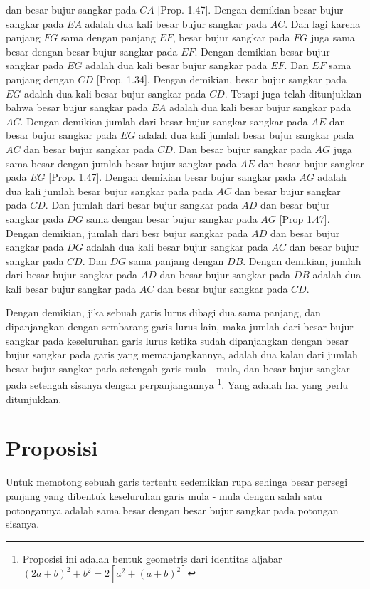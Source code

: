 \documentclass[a4paper]{book}
\begin{document}
dan besar bujur sangkar pada $CA$ [Prop. 1.47]. Dengan demikian besar bujur
sangkar pada $EA$ adalah dua kali besar bujur sangkar pada $AC$. Dan lagi 
karena panjang $FG$ sama dengan panjang $EF$, besar bujur sangkar pada $FG$
juga sama besar dengan besar bujur sangkar pada $EF$. Dengan demikian besar
bujur sangkar pada $EG$ adalah dua kali besar bujur sangkar pada $EF$. Dan 
$EF$ sama panjang dengan $CD$ [Prop. 1.34]. Dengan demikian, besar bujur 
sangkar pada $EG$ adalah dua kali besar bujur sangkar pada $CD$. Tetapi juga
telah ditunjukkan bahwa besar bujur sangkar pada $EA$ adalah dua kali besar
bujur sangkar pada $AC$. Dengan demikian jumlah dari besar bujur sangkar
sangkar pada $AE$ dan besar bujur sangkar pada $EG$   adalah dua kali 
jumlah besar bujur sangkar pada $AC$ dan besar bujur sangkar pada $CD$. Dan 
besar bujur sangkar pada $AG$ juga sama besar dengan jumlah besar bujur 
sangkar pada $AE$ dan besar bujur sangkar pada $EG$ [Prop. 1.47]. Dengan 
demikian besar bujur sangkar pada $AG$ adalah dua kali jumlah besar bujur
sangkar pada pada $AC$ dan besar bujur sangkar pada $CD$. Dan jumlah dari
besar bujur sangkar pada $AD$ dan besar bujur sangkar pada $DG$ sama dengan 
besar bujur sangkar pada $AG$ [Prop 1.47]. Dengan demikian, jumlah dari besr
bujur sangkar pada $AD$ dan besar bujur sangkar pada $DG$ adalah dua kali 
besar bujur sangkar pada $AC$ dan besar bujur sangkar pada $CD$. Dan $DG$
sama panjang dengan $DB$. Dengan demikian, jumlah dari besar bujur sangkar
pada $AD$ dan besar bujur sangkar pada $DB$ adalah dua kali besar bujur 
sangkar pada $AC$ dan besar bujur sangkar pada $CD$.

Dengan demikian, jika sebuah garis lurus dibagi dua sama panjang, 
dan dipanjangkan dengan sembarang garis lurus lain, maka jumlah dari besar 
bujur sangkar pada keseluruhan garis lurus ketika sudah dipanjangkan dengan 
besar bujur sangkar pada garis yang memanjangkannya, 
adalah dua kalau dari jumlah besar bujur sangkar pada setengah garis 
mula - mula, dan besar bujur sangkar pada setengah sisanya dengan 
perpanjangannya \footnote{Proposisi ini adalah bentuk geometris dari identitas
aljabar $(2a + b)^2 + b^2 = 2[a^2 + (a + b)^2]$}. 
Yang adalah hal yang perlu ditunjukkan.

\section*{\centering Proposisi \thesection} 
Untuk memotong sebuah garis tertentu sedemikian rupa sehinga besar persegi 
panjang yang dibentuk keseluruhan garis mula - mula dengan salah satu
potongannya adalah sama besar dengan besar bujur sangkar pada potongan sisanya.
\end{document}
